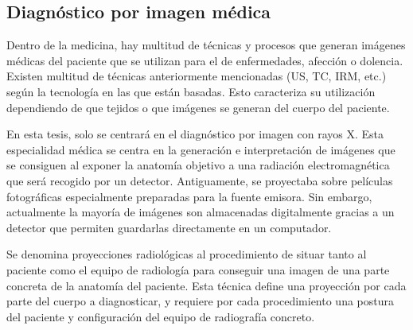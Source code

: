 \subsection{Diagnóstico por imagen médica}
\label{art:xraysim}

Dentro de la medicina, hay multitud de técnicas y procesos que generan imágenes médicas del paciente que se utilizan para el   de enfermedades, afección o dolencia. Existen multitud de técnicas anteriormente mencionadas (\ac{US}, \ac{TC}, \ac{IRM}, etc.) según la tecnología en las que están basadas. Esto caracteriza su utilización dependiendo de que tejidos o que imágenes se generan del cuerpo del paciente. 

En esta tesis, solo se centrará en el diagnóstico por imagen con rayos X. Esta especialidad médica se centra en la generación e interpretación de imágenes que se consiguen al exponer la anatomía objetivo a una radiación electromagnética que será recogido por un detector. Antiguamente, se proyectaba sobre películas fotográficas especialmente preparadas para la fuente emisora. Sin embargo, actualmente la mayoría de imágenes son almacenadas digitalmente gracias a un detector que permiten guardarlas directamente en un computador.

Se denomina proyecciones radiológicas al procedimiento de situar tanto al paciente como el equipo de radiología para conseguir una imagen de una parte concreta de la anatomía del paciente. Esta técnica define una proyección por cada parte del cuerpo a diagnosticar, y requiere por cada procedimiento una postura del paciente y configuración del equipo de radiografía concreto.

